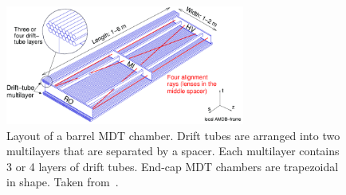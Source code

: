 \begin{figure}[htp]
    \centering
    \includegraphics[width=0.7\textwidth]{figures/atlas/atlas_mdt_drifttube.png}
    \caption{Layout of a barrel MDT chamber. Drift tubes are arranged into two multilayers that are separated by a spacer. Each multilayer contains 3 or 4 layers of drift tubes. End-cap MDT chambers are trapezoidal in shape. Taken from~\cite{atlas_collaboration_paper}.}\label{fig:mdt_chamber}
\end{figure}